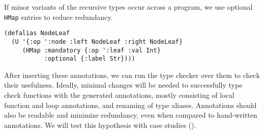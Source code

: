 \documentclass[9pt]{extarticle}
\begin{document}
If minor variants of the recursive types occur
across a program,
we use optional \texttt{HMap} entries %
to reduce redundancy.
%
\begin{Verbatim}
(defalias NodeLeaf 
  (U '{:op ':node :left NodeLeaf :right NodeLeaf}
     (HMap :mandatory {:op ':leaf :val Int}
           :optional {:label Str})))
\end{Verbatim}
%
After inserting these annotations, we can run the
type checker over them to check their usefulness.
Ideally, minimal changes will be needed to successfully type check
functions with the generated annotations,
mostly consisting of local function and loop annotations,
and renaming of type aliases.
Annotations should also be readable and minimize
redundancy, even when compared to hand-written annotations.
We will test this hypothesis with case studies
().
\end{document}
